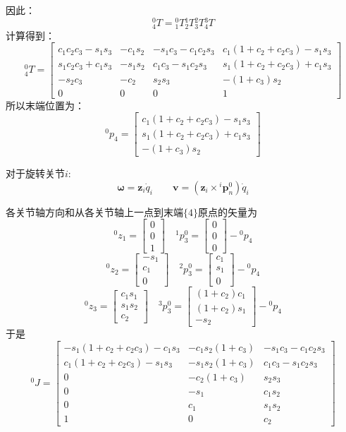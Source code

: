 {因此：
$$
{}^0_4T={}_1^0T {}_2^1T {}_3^2T {}_4^3T
$$
计算得到：
$$
{}_4^0T = \begin{bmatrix}
c_1c_2c_3 - s_1s_3 & -c_1s_2 & -s_1c_3 - c_1c_2s_3 & c_1(1+c_2+c_2c_3) - s_1s_3 \\
s_1c_2c_3 + c_1s_3 & -s_1s_2 & c_1c_3 - s_1c_2s_3 & s_1(1+c_2+c_2c_3) + c_1s_3 \\
-s_2c_3 & -c_2 & s_2s_3 & -(1+c_3)s_2 \\
0 & 0 & 0 & 1
\end{bmatrix}
$$
所以末端位置为：
$$
{}^0p_4 = 
\begin{bmatrix}
    c_1(1+c_2+c_2c_3) - s_1s_3 \\
    s_1(1+c_2+c_2c_3) + c_1s_3 \\
    -(1+c_3)s_2
\end{bmatrix}
$$

\begin{note}
    对于旋转关节$i$:
    $$\boldsymbol{\omega} = \boldsymbol{z}_i \dot{q}_i \qquad \boldsymbol{v} = (\boldsymbol{z}_i \times {}^i\boldsymbol{p}_n^0) \dot{q}_i$$
\end{note}

各关节轴方向和从各关节轴上一点到末端$\{4\}$原点的矢量为
$$
{}^0z_1 = \begin{bmatrix}0 \\ 0 \\ 1 \end{bmatrix} \quad
{}^1p_3^0 = \begin{bmatrix}0 \\ 0 \\ 0 \end{bmatrix} - {}^0p_4
$$
$$
{}^0z_2 = \begin{bmatrix}-s_1 \\ c_1 \\ 0 \end{bmatrix} \quad
{}^2p_3^0 = \begin{bmatrix}c_1 \\ s_1 \\ 0 \end{bmatrix} - {}^0p_4
$$
$$
{}^0z_3 = \begin{bmatrix}c_1s_1 \\ s_1s_2 \\ c_2 \end{bmatrix} \quad
{}^3p_3^0 = \begin{bmatrix}(1+c_2)c_1 \\ (1+c_2)s_1 \\ -s_2 \end{bmatrix} - {}^0p_4
$$
于是
$$
{}^0J = \begin{bmatrix}
-s_1(1+c_2+c_2c_3)-c_1s_3 & -c_1s_2(1+c_3) & -s_1c_3-c_1c_2s_3 \\
c_1(1+c_2+c_2c_3)-s_1s_3 & -s_1s_2(1+c_3) & c_1c_3-s_1c_2s_3 \\
0 & -c_2(1+c_3) & s_2s_3 \\
0 & -s_1 & c_1s_2 \\
0 & c_1 & s_1s_2 \\
1 & 0 & c_2
\end{bmatrix}
$$

}
